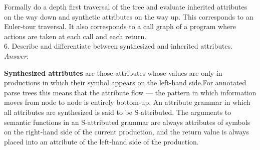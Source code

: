 \documentclass[a4paper,12pt]{article}
\begin{document}
\noindent
Formally do a depth first traversal of the tree and evaluate inherited attributes on the way down and synthetic attributes on the way up. This corresponds to an Euler-tour traversal. It also corresponds to a call graph of a program where actions are taken at each call and each return.\\
6. Describe and differentiate between synthesized and inherited attributes.\\
\emph{Answer}:

\textbf{Synthesized attributes} are those attributes whose values are only in productions in which their symbol appears on the left-hand side.For annotated parse trees this means that the attribute flow --- the pattern in
which information moves from node to node is entirely bottom-up.    An attribute grammar in which all attributes are synthesized is said to be S-attributed. The arguments to semantic functions in an S-attributed grammar are always attributes of symbols on the right-hand side of the current production, and the return value is always placed into an attribute of the left-hand
side of the production.
\end{document}
